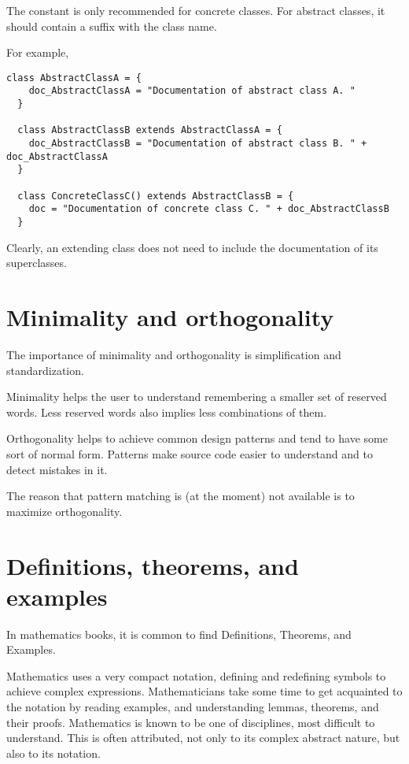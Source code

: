 The  constant is only recommended for concrete classes.
For abstract classes, it should contain a suffix with the class name.

For example,
\begin{lstlisting}[label={lst:exampleAbstractAndConcreteClassesWithComment}]
  class AbstractClassA = {
    doc_AbstractClassA = "Documentation of abstract class A. "
  }

  class AbstractClassB extends AbstractClassA = {
    doc_AbstractClassB = "Documentation of abstract class B. " + doc_AbstractClassA
  }

  class ConcreteClassC() extends AbstractClassB = {
    doc = "Documentation of concrete class C. " + doc_AbstractClassB
  }
\end{lstlisting}

Clearly, an extending class does not need to include the documentation of its superclasses.


\section{Minimality and orthogonality}

The importance of minimality and orthogonality is simplification and standardization.

Minimality helps the user to understand remembering a smaller set of reserved words.
Less reserved words also implies less combinations of them.

Orthogonality helps to achieve common design patterns and tend to have some sort of normal form.
Patterns make source code easier to understand and to detect mistakes in it.

The reason that pattern matching is (at the moment) not available is to maximize orthogonality.


\section{Definitions, theorems, and examples}

In mathematics books, it is common to find Definitions, Theorems, and Examples.

Mathematics uses a very compact notation, defining and redefining symbols to achieve complex expressions.
Mathematicians take some time to get acquainted to the notation by reading examples, and understanding lemmas, theorems, and their proofs.
Mathematics is known to be one of disciplines, most difficult to understand.
This is often attributed, not only to its complex abstract nature, but also to its notation.


